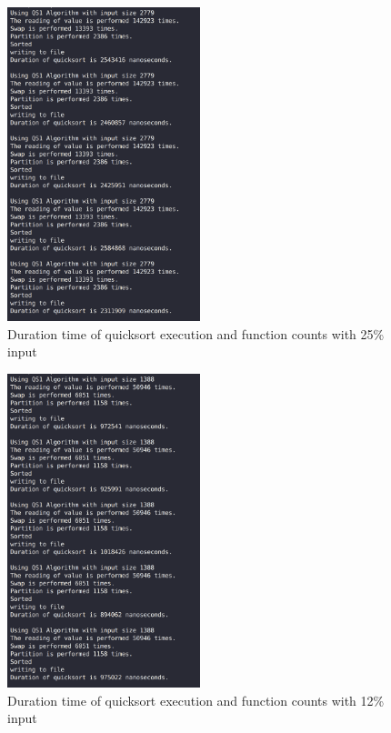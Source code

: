 \begin{figure}[H]
\begin{center}
\leavevmode
\includegraphics[width=0.5\textwidth]{qsquarter.png}
\caption{Duration time of quicksort execution and function counts with 25\% input }
\label{qs_quarter}
\end{center}
\end{figure}
\begin{figure}[H]
\begin{center}
\leavevmode
\includegraphics[width=0.5\textwidth]{qsquarterhalf.png}
\caption{Duration time of quicksort execution and function counts with 12\% input }
\label{qs_qhalf}
\end{center}
\end{figure}

